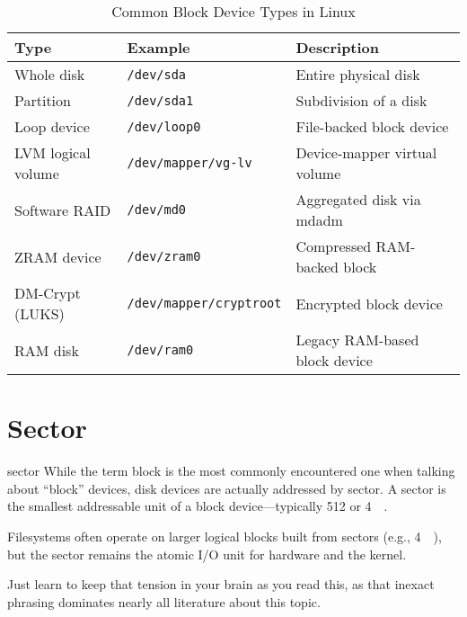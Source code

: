 \documentclass[openany, 12pt]{book}
\begin{document}
\begin{table}[h]
	\centering
	\begin{tabular}{lll}
		\toprule
		\textbf{Type}      & \textbf{Example}               & \textbf{Description}          \\
		\midrule
		Whole disk         & \texttt{/dev/sda}              & Entire physical disk          \\
		Partition          & \texttt{/dev/sda1}             & Subdivision of a disk         \\
		Loop device        & \texttt{/dev/loop0}            & File-backed block device      \\
		LVM logical volume & \texttt{/dev/mapper/vg-lv}     & Device-mapper virtual volume  \\
		Software RAID      & \texttt{/dev/md0}              & Aggregated disk via mdadm     \\
		ZRAM device        & \texttt{/dev/zram0}            & Compressed RAM-backed block   \\
		DM-Crypt (LUKS)    & \texttt{/dev/mapper/cryptroot} & Encrypted block device        \\
		RAM disk           & \texttt{/dev/ram0}             & Legacy RAM-based block device \\
		\bottomrule
	\end{tabular}
	\caption{Common Block Device Types in Linux}
\end{table}

\section{Sector}
\begin{definition}{sector}{}
	While the term block is the most commonly encountered one when talking about
	``block'' devices, disk devices are actually addressed by sector. A sector
	is the smallest addressable unit of a block device—typically \SI{512}{\byte}
	or \SI{4}{\kibi\byte}.

	Filesystems often operate on larger logical blocks built from sectors (e.g.,
	\SI{4}{\kibi\byte}), but the sector remains the atomic I/O unit for hardware
	and the kernel.

	Just learn to keep that tension in your brain as you read
	this, as that inexact phrasing dominates nearly all literature about this
	topic.
\end{definition}
\end{document}
